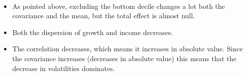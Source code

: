 \documentclass{article}
\begin{document}
\begin{figure}[H]
  \centering
  \hfill
  \\
  \caption*{}
\end{figure}

\begin{itemize}
    \item As pointed above, excluding the bottom decile changes a lot both the covariance and the mean, but the total effect is almost null.
    \item Both the dispersion of growth and income decreases.
    \item The correlation decreases, which means it increases in absolute value. Since the covariance increases (decreases in absolute value) this means that the decrease in volatilities dominates.
\end{itemize}
\end{document}
